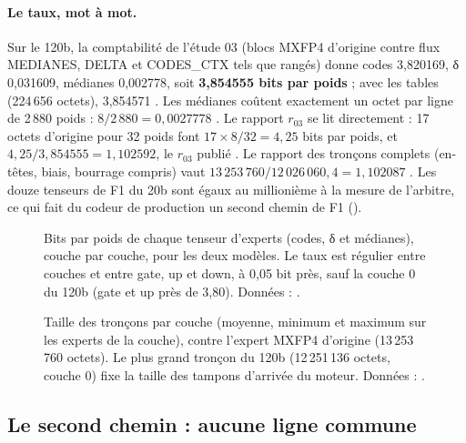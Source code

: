 \paragraph{Le taux, mot à mot.} Sur le 120b, la comptabilité de l'étude 03 (blocs MXFP4 d'origine contre flux MEDIANES, DELTA et CODES\_CTX tels que rangés) donne codes 3,820169, δ 0,031609, médianes 0,002778, soit \textbf{3,854555 bits par poids} ; avec les tables (224\,656 octets), 3,854571 \mes. Les médianes coûtent exactement un octet par ligne de 2\,880 poids : $8/2\,880 = 0{,}0027778$ \calc. Le rapport $r_{03}$ se lit directement : 17 octets d'origine pour 32 poids font $17 \times 8 / 32 = 4{,}25$ bits par poids, et $4{,}25 / 3{,}854555 = 1{,}102592$, le $r_{03}$ publié \calc. Le rapport des tronçons complets (en-têtes, biais, bourrage compris) vaut $13\,253\,760 / 12\,026\,060{,}4 = 1{,}102087$ \calc. Les douze tenseurs de F1 du 20b sont égaux au millionième à la mesure de l'arbitre, ce qui fait du codeur de production un second chemin de F1 ().

\begin{figure}[ht]
\centering
\TdFmtGrapheTaux
\caption[Bits par poids par tenseur et par couche]{Bits par poids de chaque tenseur d'experts (codes, δ et médianes), couche par couche, pour les deux modèles. Le taux est régulier entre couches et entre gate, up et down, à 0,05 bit près, sauf la couche 0 du 120b (gate et up près de 3,80). Données : .}
\label{t2fmt:fig:taux}
\end{figure}

\begin{figure}[ht]
\centering
\TdFmtGrapheTroncons
\caption[Taille des tronçons par couche]{Taille des tronçons par couche (moyenne, minimum et maximum sur les experts de la couche), contre l'expert MXFP4 d'origine (13\,253\,760 octets). Le plus grand tronçon du 120b (12\,251\,136 octets, couche 0) fixe la taille des tampons d'arrivée du moteur. Données : .}
\label{t2fmt:fig:troncons}
\end{figure}

\subsection{Le second chemin : aucune ligne commune}

